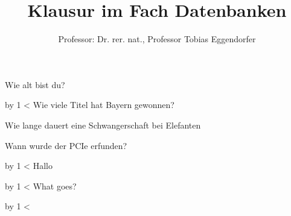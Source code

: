 \documentclass[addpoints,a4paper,ngerman,12pt,answers]{exam}
\title{Klausur im Fach Datenbanken}
\author{Professor: Dr. rer. nat., Professor Tobias Eggendorfer}
\begin{document}
\maketitle
\vspace{5cm}
\vspace{1cm}
\begin{center}
\gradetable[h][questions]
\end{center}

\newpage

\begin{questions}

\question[20]Wie alt bist du?
            \newcount\grenze
                                \newcount\Scount
        \loop\vspace*{1cm}\par\goodbreak\advance\Scount by 1 \ifnum\Scount<\grenze\repeat
        \vspace{1cm}
\question[1]Wie viele Titel hat Bayern gewonnen?
     
        \begin{checkboxes}
        
        \end{checkboxes}

        \vspace{1cm}
\question[1]Wie lange dauert eine Schwangerschaft bei Elefanten
     
        \begin{checkboxes}
        
        \end{checkboxes}

        \vspace{1cm}
\question[10]Wann wurde der PCIe erfunden?
            \newcount\grenze
                                \newcount\Scount
        \loop\vspace*{1cm}\par\goodbreak\advance\Scount by 1 \ifnum\Scount<\grenze\repeat
        \vspace{1cm}
\question[10]Hallo
            \newcount\grenze
                                \newcount\Scount
        \loop\vspace*{1cm}\par\goodbreak\advance\Scount by 1 \ifnum\Scount<\grenze\repeat
        \vspace{1cm}
\question[10]What goes?
            \newcount\grenze
                                \newcount\Scount
        \loop\vspace*{1cm}\par\goodbreak\advance\Scount by 1 \ifnum\Scount<\grenze\repeat
        \vspace{1cm}


\end{questions}
\end{document}
